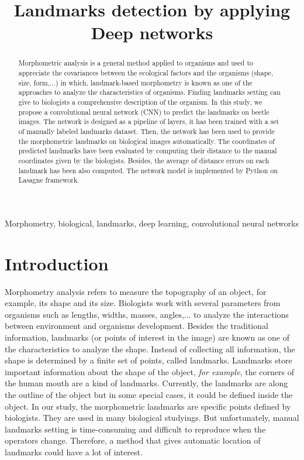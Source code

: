 \documentclass[conference]{IEEEtran}
\begin{document}
\title{Landmarks detection by applying Deep networks}

\maketitle

\begin{abstract}
Morphometric analysis is a general method applied to organisms and used to appreciate the covariances between the ecological factors and the organisms (shape, size, form,...) in which, landmark-based morphometry is known as one of the approaches to analyze the characteristics of organisms. Finding landmarks setting can give to biologists a comprehensive description of the organism. In this study, we propose a convolutional neural network (CNN) to predict the landmarks on beetle images. The network is designed as a pipeline of layers, it has been trained with a set of manually labeled landmarks dataset. Then, the network has been used to provide the morphometric landmarks on biological images automatically. The coordinates of predicted landmarks have been evaluated by computing their distance to the manual coordinates given by the biologists. Besides, the average of distance errors on each landmark has been also computed. The network model is implemented by Python on Lasagne framework.
\end{abstract}

\begin{IEEEkeywords}
Morphometry, biological, landmarks, deep learning, convolutional neural networks
\end{IEEEkeywords}

\section{Introduction}
Morphometry analysis refers to measure the topography of an object, for example, its shape and its size. Biologists work with several parameters from organisms such as lengths, widths, masses, angles,... to analyze the interactions between environment and organisms development. Besides the traditional information, landmarks (or points of interest in the image) are known as one of the characteristics to analyze the shape. Instead of collecting all information, the shape is determined by a finite set of points, called landmarks. Landmarks store important information about the shape of the object, \textit{for example}, the corners of the human mouth are a kind of landmarks. Currently, the landmarks are along the outline of the object but in some special cases, it could be defined inside the object. In our study, the morphometric landmarks are specific points defined by biologists. They are used in many biological studyings. But unfortunately, manual landmarks setting is time-consuming and difficult to reproduce when the operators change. Therefore, a method that gives automatic location of landmarks could have a lot of interest.
\end{document}
